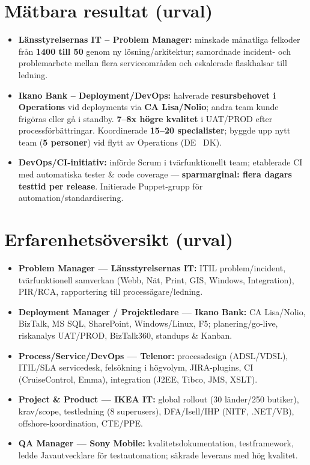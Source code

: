 \documentclass[11pt,a4paper]{article}
\begin{document}
\section*{Mätbara resultat (urval)}
\begin{itemize}
  \item \textbf{Länsstyrelsernas IT – Problem Manager:} minskade månatliga felkoder från \textbf{1400 till 50} genom ny lösning/arkitektur; samordnade incident- och problemarbete mellan flera serviceområden och eskalerade flaskhalsar till ledning.
  \item \textbf{Ikano Bank – Deployment/DevOps:} halverade \textbf{resursbehovet i Operations} vid deployments via \textbf{CA Lisa/Nolio}; andra team kunde frigöras eller gå i standby. \textbf{7–8x högre kvalitet} i UAT/PROD efter processförbättringar. Koordinerade \textbf{15–20 specialister}; byggde upp nytt team (\textbf{5 personer}) vid flytt av Operations (DE \textrightarrow\ DK).
  \item \textbf{DevOps/CI-initiativ:} införde Scrum i tvärfunktionellt team; etablerade CI med automatiska tester \& code coverage — \textbf{sparmarginal: flera dagars testtid per release}. Initierade Puppet-grupp för automation/standardisering.
\end{itemize}

\vspace{0.3em}
\section*{Erfarenhetsöversikt (urval)}
\begin{itemize}
  \item \textbf{Problem Manager — Länsstyrelsernas IT:} ITIL problem/incident, tvärfunktionell samverkan (Webb, Nät, Print, GIS, Windows, Integration), PIR/RCA, rapportering till processägare/ledning.
  \item \textbf{Deployment Manager / Projektledare — Ikano Bank:} CA Lisa/Nolio, BizTalk, MS SQL, SharePoint, Windows/Linux, F5; planering/go-live, riskanalys UAT/PROD, BizTalk360, standups \& Kanban.
  \item \textbf{Process/Service/DevOps — Telenor:} processdesign (ADSL/VDSL), ITIL/SLA servicedesk, felsökning i högvolym, JIRA-plugins, CI (CruiseControl, Emma), integration (J2EE, Tibco, JMS, XSLT).
  \item \textbf{Project \& Product — IKEA IT:} global rollout (30 länder/250 butiker), krav/scope, testledning (8 superusers), DFA/Isell/IHP (NITF, .NET/VB), offshore-koordination, CTE/PPE.
  \item \textbf{QA Manager — Sony Mobile:} kvalitetsdokumentation, testframework, ledde Javautvecklare för testautomation; säkrade leverans med hög kvalitet.
\end{itemize}
\end{document}
